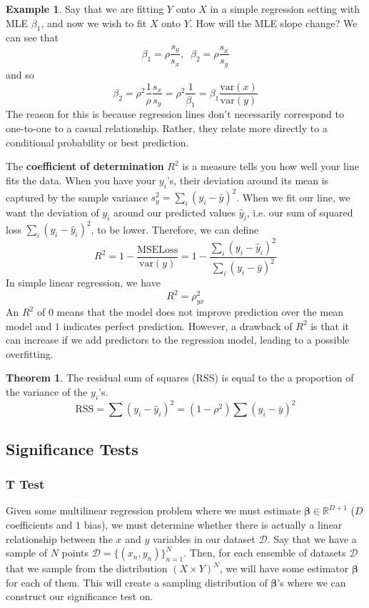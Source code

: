 \documentclass{article}
\theoremstyle{definition}
\newtheorem{theorem}{Theorem}[section]
\newtheorem{example}{Example}[section]
\theoremstyle{remark}
\theoremstyle{definition}
\begin{document}
\begin{example}
Say that we are fitting $Y$ onto $X$ in a simple regression setting with MLE $\beta_1$, and now we wish to fit $X$ onto $Y$. How will the MLE slope change? We can see that 
\[\beta_1 = \rho \frac{s_y}{s_x} , \;\; \beta_2 = \rho \frac{s_x}{s_y}\]
and so 
\[\beta_2 = \rho^2 \frac{1}{\rho} \frac{s_x}{s_y} = \rho^2 \frac{1}{\beta_1} = \beta_1 \frac{\mathrm{var}(x)}{\mathrm{var}(y)}\]
The reason for this is because regression lines don't necessarily correspond to one-to-one to a casual relationship. Rather, they relate more directly to a conditional probability or best prediction. 
\end{example}

The \textbf{coefficient of determination} $R^2$ is a measure tells you how well your line fits the data. When you have your $y_i$'s, their deviation around its mean is captured by the sample variance $s^2_y = \sum_i (y_i - \bar{y})^2$. When we fit our line, we want the deviation of $y_i$ around our predicted values $\hat{y}_i$, i.e. our sum of squared loss $\sum_i (y_i - \hat{y}_i)^2$, to be lower. Therefore, we can define 
\[R^2 = 1 - \frac{\mathrm{MSE Loss}}{\mathrm{var}(y)} = 1 - \frac{\sum_i (y_i - \hat{y}_i)^2}{\sum_i (y_i - \bar{y})^2}\]
In simple linear regression, we have 
\[R^2 = \rho_{yx}^2\]
An $R^2$ of $0$ means that the model does not improve prediction over the mean model and $1$ indicates perfect prediction. However, a drawback of $R^2$ is that it can increase if we add predictors to the regression model, leading to a possible overfitting. 

\begin{theorem}
The residual sum of squares (RSS) is equal to the a proportion of the variance of the $y_i$'s. 
\[\mathrm{RSS} = \sum (y_i - \hat{y}_i)^2 = (1 - \rho^2) \sum (y_i - \bar{y})^2 \]
\end{theorem}

\subsection{Significance Tests}

\subsubsection{T Test}

Given some multilinear regression problem where we must estimate $\boldsymbol{\beta} \in \mathbb{R}^{D + 1}$ ($D$ coefficients and $1$ bias), we must determine whether there is actually a linear relationship between the $x$ and $y$ variables in our dataset $\mathcal{D}$. Say that we have a sample of $N$ points $\mathcal{D} = \{(x_n, y_n)\}_{n=1}^N$. Then, for each ensemble of datasets $\mathcal{D}$ that we sample from the distribution $(X \times Y)^N$, we will have some estimator $\boldsymbol{\beta}$ for each of them. This will create a sampling distribution of $\boldsymbol{\beta}$'s where we can construct our significance test on. 
\end{document}
